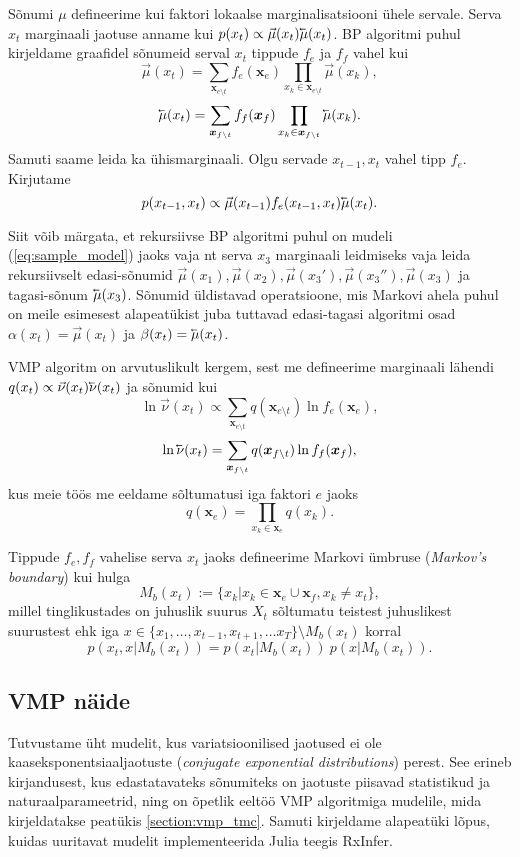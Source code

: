 Sõnumi $\mu$ defineerime kui faktori lokaalse marginalisatsiooni ühele servale. Serva 
$x_t$ marginaali jaotuse anname kui $p(x_t) \propto \vec{\mu}(x_t) \cev{\mu}(x_t)$. BP algoritmi puhul kirjeldame graafidel sõnumeid serval $x_t$ tippude $f_e$ ja $f_f$ vahel kui
$$\vec{\mu}(x_t) = \sum_{\bm{x}_{e\setminus t}} f_e(\bm{x}_e) \prod_{x_k \in \bm{x}_{e\setminus t}} \vec{\mu}(x_k),$$
$$\cev{\mu}(x_t) = \sum_{\bm{x}_{f\setminus t}} f_f(\bm{x}_f) \prod_{x_k \in \bm{x}_{f\setminus t}} \cev{\mu}(x_k).$$
Samuti saame leida ka ühismarginaali. Olgu servade $x_{t-1},x_t$ vahel tipp $f_e$. Kirjutame
$$p(x_{t-1},x_t) \propto \vec{\mu}(x_{t-1}) f_e(x_{t-1},x_t) \cev{\mu}(x_t) .$$

Siit võib märgata, et rekursiivse BP algoritmi puhul on mudeli (\ref{eq:sample_model}) jaoks vaja nt serva $x_3$ marginaali leidmiseks vaja leida rekursiivselt edasi-sõnumid $\vec{\mu}(x_1),\vec{\mu}(x_2),\vec{\mu}(x_3'),\vec{\mu}(x_3''),\vec{\mu}(x_3)$ ja tagasi-sõnum $\cev{\mu}(x_3)$. Sõnumid üldistavad operatsioone, mis Markovi ahela puhul on meile esimesest alapeatükist juba tuttavad edasi-tagasi algoritmi osad $\alpha(x_t) = \vec{\mu}(x_t)$ ja $\beta(x_t) = \cev{\mu}(x_t)$.

VMP algoritm on arvutuslikult kergem, sest me defineerime marginaali lähendi $q(x_t) \propto \vec{\nu}(x_t) \cev{\nu}(x_t)$ ja sõnumid kui
$$\ln \vec{\nu}(x_t) \propto \sum_{\bm{x}_{e\setminus t}} q(\bm{x}_{e \setminus t}) \ln f_e(\bm{x}_e),$$
$$\ln \cev{\nu}(x_t) = \sum_{\bm{x}_{f\setminus t}}  q(\bm{x}_{f \setminus t}) \ln f_f(\bm{x}_f),$$
kus meie töös me eeldame sõltumatusi iga faktori $e$ jaoks
$$q(\bm{x}_{e}) = \prod_{x_k \in \bm{x}_{e}} q(x_k).$$

Tippude $f_e,f_f$ vahelise serva $x_t$ jaoks defineerime Markovi ümbruse (\emph{Markov's boundary}) kui hulga
$$M_b(x_t) := \{x_k | x_k \in \bm{x}_e \cup \bm{x}_f, x_k \ne x_t \} ,$$
millel tinglikustades on juhuslik suurus $X_t$ sõltumatu teistest juhuslikest suurustest ehk iga $x \in \{x_1,\ldots,x_{t-1},x_{t+1},\ldots x_T\} \setminus M_b(x_t)$ korral
$$p(x_t,x|M_b(x_t)) = p(x_t|M_b(x_t))\ p(x|M_b(x_t)).$$

\subsection{VMP näide}

Tutvustame üht mudelit, kus variatsioonilised jaotused ei ole kaaseksponentsiaaljaotuste (\emph{conjugate exponential distributions}) perest. See erineb kirjandusest, kus edastatavateks sõnumiteks on jaotuste piisavad statistikud ja naturaalparameetrid, ning on õpetlik eeltöö VMP algoritmiga mudelile, mida kirjeldatakse peatükis \ref{section:vmp_tmc}. Samuti kirjeldame alapeatüki lõpus, kuidas uuritavat mudelit implementeerida Julia teegis RxInfer.

